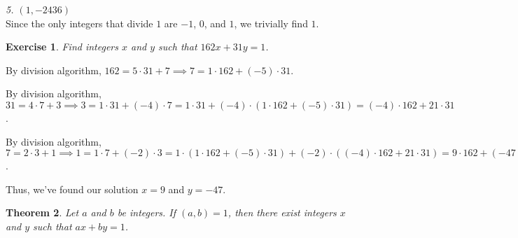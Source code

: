 \documentclass{article}
\newtheorem{thm}{Theorem}[section]
\newtheorem{ex}[thm]{Exercise}
\numberwithin{equation}{thm}
\begin{document}
\hspace*{5mm} \emph{5. $(1, -2436)$} \\
\hspace*{15mm} Since the only integers that divide $1$ are $-1$, $0$, and $1$, we trivially find $1$. \\



\begin{ex} \label{1.37}
  Find integers $x$ and $y$ such that $162x + 31y = 1$.
\end{ex}

By division algorithm, $162 = 5 \cdot 31 + 7 \implies 7 = 1 \cdot 162 + (-5) \cdot 31$.

By division algorithm, $31 = 4 \cdot 7 + 3 \implies 3 = 1 \cdot 31 + (-4) \cdot 7 = 1 \cdot 31 + (-4) \cdot (1 \cdot 162 + (-5) \cdot 31) = (-4) \cdot 162 + 21 \cdot 31$.

By division algorithm, $7 = 2 \cdot 3 + 1 \implies 1 = 1 \cdot 7 + (-2) \cdot 3 = 1 \cdot (1 \cdot 162 + (-5) \cdot 31) + (-2) \cdot ((-4) \cdot 162 + 21 \cdot 31) = 9 \cdot 162 + (-47) \cdot 31$.

Thus, we've found our solution $x = 9$ and $y = -47$.



\pagebreak



\begin{thm} \label{1.38}
  Let $a$ and $b$ be integers. If $(a, b) = 1$, then there exist integers $x$ and $y$ such that $ax + by = 1$.
\end{thm}
\end{document}
